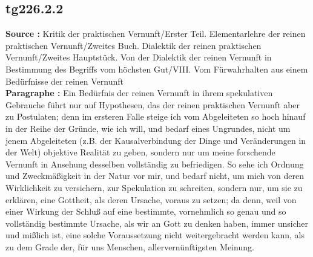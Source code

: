 \documentclass[a4paper,12pt,twoside]{book}
\begin{document}
	\subsection*{tg226.2.2} 
	\textbf{Source : }Kritik der praktischen Vernunft/Erster Teil. Elementarlehre der reinen praktischen Vernunft/Zweites Buch. Dialektik der reinen praktischen Vernunft/Zweites Hauptstück. Von der Dialektik der reinen Vernunft in Bestimmung des Begriffs vom höchsten Gut/VIII. Vom Fürwahrhalten aus einem Bedürfnisse der reinen Vernunft\\  
	
	\textbf{Paragraphe : }Ein Bedürfnis der reinen Vernunft in ihrem spekulativen Gebrauche führt nur auf Hypothesen, das der reinen praktischen Vernunft aber zu Postulaten; denn im ersteren Falle steige ich vom Abgeleiteten so hoch hinauf in der Reihe der Gründe, wie ich will, und bedarf eines Ungrundes, nicht um jenem Abgeleiteten (z.B. der Kausalverbindung der Dinge und Veränderungen in der Welt) objektive Realität zu geben, sondern nur um meine forschende Vernunft in Ansehung desselben vollständig zu befriedigen. So sehe ich Ordnung und Zweckmäßigkeit in der Natur vor mir, und bedarf nicht, um mich von deren Wirklichkeit zu versichern, zur Spekulation zu schreiten, sondern nur, um sie zu erklären, eine Gottheit, als deren Ursache, voraus zu setzen; da denn, weil von einer Wirkung der Schluß auf eine bestimmte, vornehmlich so genau und so vollständig bestimmte Ursache, als wir an Gott zu denken haben, immer unsicher und mißlich ist, eine solche Voraussetzung nicht weitergebracht werden kann, als zu dem Grade der, für uns Menschen, allervernünftigsten Meinung.
	
\end{document}
